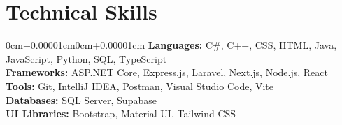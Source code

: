 \documentclass[10pt, letterpaper]{article}
\newenvironment{onecolentry}{\begin{adjustwidth}{0cm+0.00001cm}{0cm+0.00001cm}}{\end{adjustwidth}}
\begin{document}
\section{Technical Skills}
\begin{onecolentry}
   \small \textbf{Languages:} C\#, C++, CSS, HTML, Java, JavaScript, Python, SQL, TypeScript \\
    \vspace{0.05cm}
   \small \textbf{Frameworks:} ASP.NET Core, Express.js, Laravel, Next.js, Node.js, React \\
    \vspace{0.05cm}
   \small \textbf{Tools:} Git, IntelliJ IDEA, Postman, Visual Studio Code, Vite \\
    \vspace{0.05cm}
   \small \textbf{Databases:} SQL Server, Supabase \\
    \vspace{0.05cm}
   \small \textbf{UI Libraries:} Bootstrap, Material-UI, Tailwind CSS \\
    \vspace{0.05cm}

\end{onecolentry}
\end{document}
